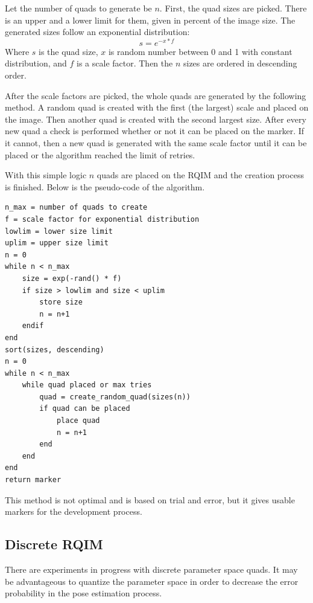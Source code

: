 Let the number of quads to generate be $n$.
First, the quad sizes are picked.
There is an upper and a lower limit for them, given in percent of the image size.
The generated sizes follow an exponential distribution:
\begin{equation}
	s = e^{-x*f}
\end{equation}
Where $s$ is the quad size, $x$ is random number between 0 and 1 with constant distribution, and $f$ is a scale factor.
Then the $n$ sizes are ordered in descending order.

After the scale factors are picked, the whole quads are generated by the following method.
A random quad is created with the first (the largest) scale and placed on the image.
Then another quad is created with the second largest size.
After every new quad a check is performed whether or not it can be placed on the marker.
If it cannot, then a new quad is generated with the same scale factor until it can be placed or the algorithm reached the limit of retries.

With this simple logic $n$ quads are placed on the RQIM and the creation process is finished.
Below is the pseudo-code of the algorithm.

\begin{lstlisting}
n_max = number of quads to create
f = scale factor for exponential distribution
lowlim = lower size limit
uplim = upper size limit
n = 0
while n < n_max
	size = exp(-rand() * f)
	if size > lowlim and size < uplim
		store size
		n = n+1
	endif
end
sort(sizes, descending)
n = 0
while n < n_max
	while quad placed or max tries
		quad = create_random_quad(sizes(n))
		if quad can be placed
			place quad
			n = n+1
		end
	end
end
return marker
\end{lstlisting}

This method is not optimal and is based on trial and error, but it gives usable markers for the development process.

\subsection{Discrete RQIM}

There are experiments in progress with discrete parameter space quads.
It may be advantageous to quantize the parameter space in order to decrease the error probability in the pose estimation process.

